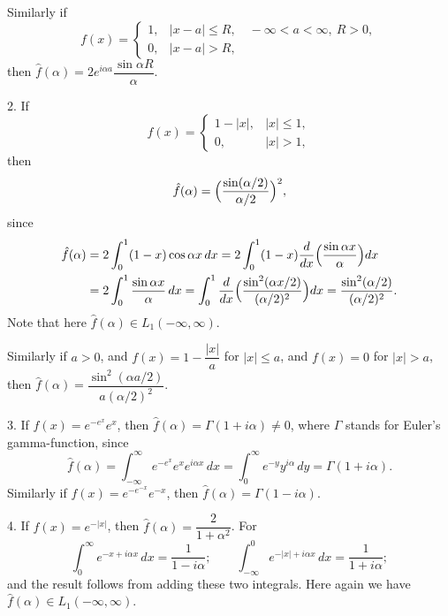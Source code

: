 Similarly if
\begin{equation*}
f(x)=
\begin{cases}
1,&|x-a|\le R,\quad -\infty<a<\infty,\ R>0,\\
0,&|x-a|>R,
\end{cases}
\end{equation*}
then $\hat f(\alpha)=2e^{i\alpha a}\dfrac{\sin\alpha R}{\alpha}$.

2. If
\begin{equation*}
f(x)=
\begin{cases}
1-|x|,&|x|\le 1,\\
0,&|x|>1,
\end{cases}
\end{equation*}
then
\begin{equation*}
\hat f(\alpha)=\Bigl(\frac{\sin(\alpha/2)}{\alpha/2}\Bigr)^2,
\end{equation*}
since
\begin{align*}
\hat f(\alpha)&=2\int_0^1(1-x)\cos\alpha x\,dx
=2\int_0^1(1-x)\frac{d}{dx}\Bigl(\frac{\sin\alpha x}{\alpha}\Bigr)dx\\
&=2\int_0^1\frac{\sin\alpha x}{\alpha}\,dx
=\int_0^1\frac{d}{dx}\Bigl(\frac{\sin^2(\alpha x/2)}{(\alpha/2)^2}\Bigr)dx
=\frac{\sin^2(\alpha/2)}{(\alpha/2)^2}.
\end{align*}
Note that here $\hat f(\alpha)\in L_1(-\infty,\infty)$.

Similarly if $a>0$, and $f(x)=1-\dfrac{|x|}{a}$ for $|x|\le a$, and $f(x)=0$ for $|x|>a$, then $\hat f(\alpha)=\dfrac{\sin^2(\alpha a/2)}{a(\alpha/2)^2}$.

3. If $f(x)=e^{-e^x}e^x$, then $\hat f(\alpha)=\Gamma(1+i\alpha)\neq 0$, where $\Gamma$ stands for Euler's gamma-function, since
\begin{equation*}
\hat f(\alpha)=\int_{-\infty}^{\infty}e^{-e^x}e^xe^{i\alpha x}\,dx
=\int_0^\infty e^{-y}y^{i\alpha}\,dy
=\Gamma(1+i\alpha).
\end{equation*}
Similarly if $f(x)=e^{-e^{-x}}e^{-x}$, then $\hat f(\alpha)=\Gamma(1-i\alpha)$.

4. If $f(x)=e^{-|x|}$, then $\hat f(\alpha)=\dfrac{2}{1+\alpha^2}$. For
\begin{equation*}
\int_0^\infty e^{-x+i\alpha x}\,dx=\frac{1}{1-i\alpha};
\qquad
\int_{-\infty}^0 e^{-|x|+i\alpha x}\,dx=\frac{1}{1+i\alpha};
\end{equation*}
and the result follows from adding these two integrals. Here again we have $\hat f(\alpha)\in L_1(-\infty,\infty)$.


